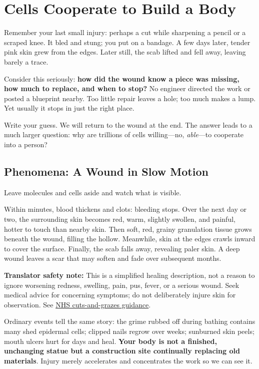 \chapter{Cells Cooperate to Build a Body}

\begin{kaichang}
Remember your last small injury: perhaps a cut while sharpening a pencil or a scraped knee. It bled and stung; you put on a bandage. A few days later, tender pink skin grew from the edges. Later still, the scab lifted and fell away, leaving barely a trace.

Consider this seriously: \textbf{how did the wound know a piece was missing, how much to replace, and when to stop?} No engineer directed the work or posted a blueprint nearby. Too little repair leaves a hole; too much makes a lump. Yet usually it stops in just the right place.

Write your guess. We will return to the wound at the end. The answer leads to a much larger question: why are trillions of cells willing---no, \emph{able}---to cooperate into a person?
\end{kaichang}

\section{Phenomena: A Wound in Slow Motion}

Leave molecules and cells aside and watch what is visible.

Within minutes, blood thickens and clots: bleeding stops. Over the next day or two, the surrounding skin becomes red, warm, slightly swollen, and painful, hotter to touch than nearby skin. Then soft, red, grainy granulation tissue grows beneath the wound, filling the hollow. Meanwhile, skin at the edges crawls inward to cover the surface. Finally, the scab falls away, revealing paler skin. A deep wound leaves a scar that may soften and fade over subsequent months.

\textbf{Translator safety note:} This is a simplified healing description, not a reason to ignore worsening redness, swelling, pain, pus, fever, or a serious wound. Seek medical advice for concerning symptoms; do not deliberately injure skin for observation. See \href{https://www.nhs.uk/conditions/cuts-and-grazes/}{NHS cuts-and-grazes guidance}.

Ordinary events tell the same story: the grime rubbed off during bathing contains many shed epidermal cells; clipped nails regrow over weeks; sunburned skin peels; mouth ulcers hurt for days and heal. \textbf{Your body is not a finished, unchanging statue but a construction site continually replacing old materials}. Injury merely accelerates and concentrates the work so we can see it.

